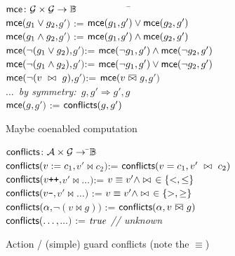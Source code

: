 \documentclass{paper}
\begin{document}
\begin{algorithm}[p]
\begin{ntabbing}\hspace{-.8ex}
$\textsf{mce}\colon\mathcal{G}\times\mathcal{G}\rightarrow \mathbb{B}$\=~~~~~~~~~~~\=~~~~~~~~~~~~~~~~~~~~~\=
\label{}\\
$\textsf{mce}(g_1\lor g_2,$\>$g')$ \>:= $\textsf{mce}(g_1,$\>$g')\lor\textsf{mce}(g_2, g')$\label{}\\
$\textsf{mce}(g_1\land g_2,$\>$g')$ \>:= $\textsf{mce}(g_1,$\>$g')\land\textsf{mce}(g_2,g')$\label{}\\
$\textsf{mce}(\neg(g_1\lor g_2),$\>$g')$\>:= $\textsf{mce}(\neg g_1,$\>$g')\land\textsf{mce}(\neg g_2,g')$
\label{}\\
$\textsf{mce}(\neg(g_1\land g_2),$\>$g')$\>:= $\textsf{mce}(\neg g_1,$\>$g')\lor\textsf{mce}(\neg g_2,g')$
\label{}\\
$\textsf{mce}(\neg(v~\bowtie~g),$\>$g')$\>:= $\textsf{mce}(v~\overline{\bowtie}~g,$\>$g')$
\label{}\\
$\dots$\textit{~by symmetry:~$g, g'\Rightarrow g', g$}\label{}\\

$\textsf{mce}(g, $\>$g')$ \>:= $\textsf{conflicts}(g,g')$
\label{}\\
\end{ntabbing}\vspace{-2em}
\caption{Maybe coenabled computation}
\end{algorithm}
\vspace{-3em}



\begin{algorithm}[p]
\begin{ntabbing}\hspace{-.8ex}
$\textsf{conflicts}\colon \mathcal{A} \times \mathcal{G} \rightarrow$
\=$\mathbb{B}$~~~~~~~~~~~\=
\label{}\\

$\textsf{conflicts}(v:=c_1,$\>$v'\bowtie c_2)$\>:=
$\textsf{conflicts}(v=c_1,v'~\bowtie~c_2)$
\label{}\\

$\textsf{conflicts}(v\texttt{++},$\>$v'\bowtie\dots)$\>:=
$v\equiv v'\land\bowtie\hspace{1ex}\in\{<,\leq\}$
\label{}\\
$\textsf{conflicts}(v\texttt{--}, $\>$v' \bowtie \dots)$ \>:=
$v\equiv v'\land\bowtie\hspace{1ex}\in\{>,\geq\}$
\label{}\\
$\textsf{conflicts}(\alpha, $\>$\neg (v \bowtie g))$ \>:=
$\textsf{conflicts}(\alpha,v~\overline{\bowtie}~g)$
\label{}\\
$\textsf{conflicts}(\dots, $\>$\dots)$ \>:= $\mathit{true}$ \textit{// unknown}
\label{}\\
\end{ntabbing}\vspace{-2em}
\caption{Action / (simple) guard conflicts (note the $\equiv$)}
\end{algorithm}
\vspace{-3em}
\end{document}
